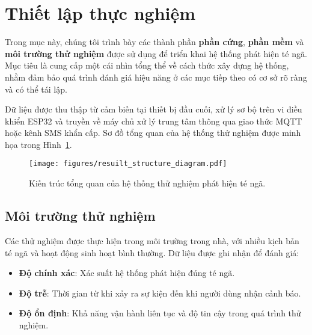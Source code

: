 
\section{Thiết lập thực nghiệm}
\label{sec:experimental_setup}
Trong mục này, chúng tôi trình bày các thành phần \textbf{phần cứng}, \textbf{phần mềm} và \textbf{môi trường thử nghiệm} được sử dụng để triển khai hệ thống phát hiện té ngã.  
Mục tiêu là cung cấp một cái nhìn tổng thể về cách thức xây dựng hệ thống, nhằm đảm bảo quá trình đánh giá hiệu năng ở các mục tiếp theo có cơ sở rõ ràng và có thể tái lập.  

Dữ liệu được thu thập từ cảm biến tại thiết bị đầu cuối, xử lý sơ bộ trên vi điều khiển ESP32 và truyền về máy chủ xử lý trung tâm thông qua giao thức MQTT hoặc kênh SMS khẩn cấp.  
Sơ đồ tổng quan của hệ thống thử nghiệm được minh họa trong Hình~\ref{fig:system_structure}.

\begin{figure}[H]
    \centering
    \texttt{[image: figures/resuilt\_structure\_diagram.pdf]}
    \caption{Kiến trúc tổng quan của hệ thống thử nghiệm phát hiện té ngã.}
    \label{fig:system_structure}
\end{figure}

\subsection{Môi trường thử nghiệm}
Các thử nghiệm được thực hiện trong môi trường trong nhà, với nhiều kịch bản té ngã và hoạt động sinh hoạt bình thường. Dữ liệu được ghi nhận để đánh giá:
\begin{itemize}
    \item \textbf{Độ chính xác}: Xác suất hệ thống phát hiện đúng té ngã.
    \item \textbf{Độ trễ}: Thời gian từ khi xảy ra sự kiện đến khi người dùng nhận cảnh báo.
    \item \textbf{Độ ổn định}: Khả năng vận hành liên tục và độ tin cậy trong quá trình thử nghiệm.
\end{itemize}

